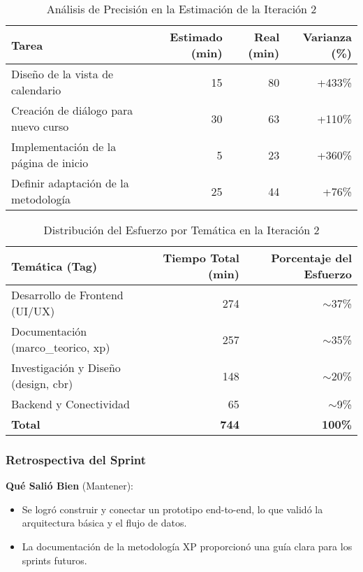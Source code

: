 \begin{table}[H]
    \caption{Análisis de Precisión en la Estimación de la Iteración 2}
    \label{tab:sprint-2-estimation-accuracy}
    \begin{tabularx}{\textwidth}{@{}Xrrr@{}}
        \toprule
        \textbf{Tarea} & \textbf{Estimado (min)} & \textbf{Real (min)} & \textbf{Varianza (\%)} \\
        \midrule
        Diseño de la vista de calendario & 15 & 80 & +433\% \\
        Creación de diálogo para nuevo curso & 30 & 63 & +110\% \\
        Implementación de la página de inicio & 5 & 23 & +360\% \\
        Definir adaptación de la metodología & 25 & 44 & +76\% \\
        \bottomrule
    \end{tabularx}
\end{table}

\begin{table}[H]
    \caption{Distribución del Esfuerzo por Temática en la Iteración 2}
    \label{tab:sprint-2-effort-distribution}
    \begin{tabularx}{\textwidth}{@{}Xrr@{}}
        \toprule
        \textbf{Temática (Tag)} & \textbf{Tiempo Total (min)} & \textbf{Porcentaje del Esfuerzo} \\
        \midrule
        Desarrollo de Frontend (UI/UX) & 274 & $\sim$37\% \\
        Documentación (marco\_teorico, xp) & 257 & $\sim$35\% \\
        Investigación y Diseño (design, cbr) & 148 & $\sim$20\% \\
        Backend y Conectividad & 65 & $\sim$9\% \\
        \midrule
        \textbf{Total} & \textbf{744} & \textbf{100\%} \\
        \bottomrule
    \end{tabularx}
\end{table}

\subsubsection{Retrospectiva del Sprint}

\textbf{Qué Salió Bien} (Mantener):
\begin{itemize}
    \item Se logró construir y conectar un prototipo end-to-end, lo que validó la arquitectura básica y el flujo de datos.
    \item La documentación de la metodología XP proporcionó una guía clara para los sprints futuros.
\end{itemize}

